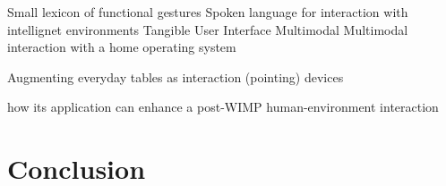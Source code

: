 \documentclass[oribibl]{llncs}
\begin{document}
Small lexicon of functional gestures \cite{Carrino:2013:FGH:2530824.2530844}
Spoken language for interaction with intellignet environments \cite{Minker:2009:RSL:1735821.1735825}
Tangible User Interface
\cite{Bartolini:2012:RNI:2387476.2387479}
Multimodal
\cite{Carrino:2011:HSE:2070481.2070501}
Multimodal interaction with a home operating system \cite{Weingarten:2010:TMI:1858171.1858255}



Augmenting everyday tables as interaction (pointing) devices \cite{Schmidt:2002:UIU:1765426.1765451}

how its application can enhance a post-WIMP human-environment interaction

\section{Conclusion}

\newpage


\end{document}

